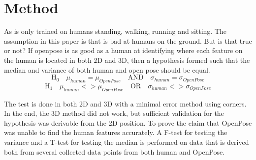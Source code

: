 \section{Method} 
\label{sec:method}
As \openpose is only trained on humans standing, walking, running and sitting.
The assumption in this paper is that \openpose is bad at humans on the ground.
But is that true or not?
If openpose is as good as a human at identifying where each feature on the human is located in both 2D and 3D, then a hypothesis formed such that the median and variance of both human and open pose should be equal.
$$
\text{H}_0\quad \mu_{human} = \mu_{OpenPose} \quad\text{AND}\quad \sigma_{human} = \sigma_{OpenPose}
$$
$$
\text{H}_1\quad \mu_{human} <> \mu_{OpenPose} \quad\text{OR}\quad \sigma_{human} <> \sigma_{OpenPose}
$$


The test is done in both 2D and 3D with a minimal error method using \aruco corners.
In the end, the 3D method did not work, but sufficient validation for the hypothesis was derivable from the 2D position.
To prove the claim that OpenPose was unable to find the human features accurately.
A F-test for testing the variance and a T-test for testing the median is performed on data that is derived both from several collected data points from both human and OpenPose.





